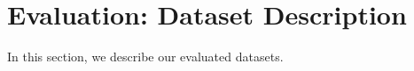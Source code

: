 \begin{comment}
\section{Visual illustration of the \propa}\label{sec:appex_visual_illustration}
\paragraph{Illustration of the \propa}
We next illustrate how the \propa enables \tool to repair a network to be DP with a minor accuracy decrease.
We consider the 50x2 network for Twitter, and let \tool compute its \propa for each class separately ($\beta_0$ and $\beta_1$).
 \Cref{fig::eval1} plots the classification confidence of each input in the test set, where inputs labeled as $0$ are shown on the left  plot and inputs labeled as $1$ are shown on the right plot. The plots show in a green dashed line the \propa, in blue points the test points whose confidence is greater than the \propa and in red points the test points whose confidence is smaller or equal to the \propa. The plots 
 show that the confidence of the vast majority of points in the test set is over the \propa. Recall that for these points, \tool does not add noise, and thus it obtains an overall a minor accuracy decrease.
 \begin{figure*}[t]
    \centering
  \texttt{[image: images/figures.pdf]}
    \caption{Illustration of the \propa and the confidence of test samples with respect to it for the Twitter 50x2 network. }
    \label{fig::eval1}
\end{figure*}
\end{comment} 
\newpage
\section{Evaluation: Dataset Description}\label{sec:appeval}
In this section, we describe our evaluated datasets. %


